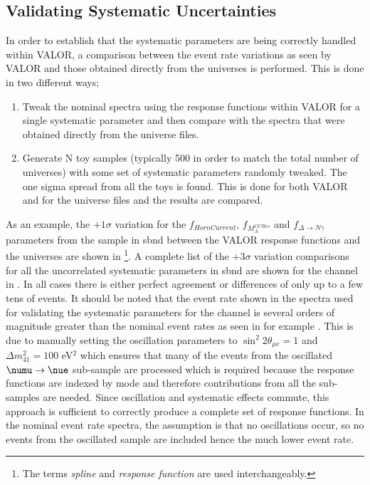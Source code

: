 \subsection{Validating Systematic Uncertainties}
In order to establish that the systematic parameters are being correctly handled within VALOR, a comparison between the event rate variations as seen by VALOR and those obtained directly from the universes is performed. This is done in two different ways; 
\begin{enumerate}
    \item Tweak the nominal spectra using the response functions within VALOR for a single systematic parameter and then compare with the spectra that were obtained directly from the universe files.
    \item Generate N toy samples (typically 500 in order to match the total number of universes) with some set of systematic parameters randomly tweaked. The one sigma spread from all the toys is found. This is done for both VALOR and for the universe files and the results are compared. 
\end{enumerate}

As an example, the $+1\sigma$ variation for the $f_{HornCurrent}$, $f_{M_A^{CCRes}}$ and $f_{\Delta \rightarrow N \gamma}$ parameters from the \nue sample in \gls{sbnd} between the VALOR response functions and the universes are shown in \footnote{The terms \textit{spline} and \textit{response function} are used interchangeably.}. A complete list of the $+3\sigma$ variation comparisons for all the uncorrelated systematic parameters in \gls{sbnd} are shown for the \nue channel in . In all cases there is either perfect agreement or differences of only up to a few tens of events. It should be noted that the event rate shown in the spectra used for validating the systematic parameters for the \nue channel is several orders of magnitude greater than the nominal event rates as seen in for example . This is due to manually setting the oscillation parameters to $\sin^2{2\theta_{\mu e}} = 1$ and $\Delta m_{41}^2 = 100$ eV$^2$ which ensures that many of the events from the oscillated $\numu \rightarrow \nue$ sub-sample are processed which is required because the response functions are indexed by mode and therefore contributions from all the sub-samples are needed. Since oscillation and systematic effects commute, this approach is sufficient to correctly produce a complete set of response functions. In the nominal event rate spectra, the assumption is that no oscillations occur, so no events from the oscillated sample are included hence the much lower event rate. 

